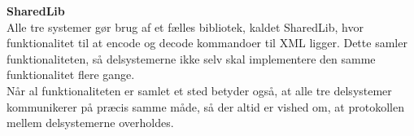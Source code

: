 \textbf{SharedLib}\\
Alle tre systemer gør brug af et fælles bibliotek, kaldet SharedLib, hvor funktionalitet til at encode og decode kommandoer til XML ligger. Dette samler funktionaliteten, så delsystemerne ikke selv skal implementere den samme funktionalitet flere gange.\\
Når al funktionaliteten er samlet et sted betyder også, at alle tre delsystemer kommunikerer på præcis samme måde, så der altid er vished om, at protokollen mellem delsystemerne overholdes.\\